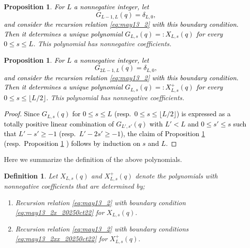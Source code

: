 \documentclass[sn-mathphys-num]{sn-jnl}%
\newcommand{\red}[1]{\textcolor{black}{#1}}
\theoremstyle{thmstyleone}%
\newtheorem{proposition}[theorem]{Proposition}%
\theoremstyle{thmstyletwo}%
\theoremstyle{thmstylethree}%
\newtheorem{definition}{Definition}%
\begin{document}
\begin{proposition}\label{prop:2025oct24_1}
\red{For $L$ a nonnegative integer, let 
\begin{equation} \label{eq:may13_2x_20250ct22}
G_{L-1,L}(q) = \delta_{L,0}, 
\end{equation}
and consider the recursion relation \eqref{eq:may13_2} with this boundary condition.
Then it determines a unique polynomial $G_{L,s}(q) =: X_{L,s}(q)$ for every $0 \leq s \leq L$.}
This polynomial has nonnegative coefficients.
\end{proposition}

\begin{proposition}\label{prop:2025oct24_2}
\red{For $L$ a nonnegative integer, let 
\begin{equation} \label{eq:may13_2xx_20250ct22}
G_{2L-1,L}(q) = \delta_{L,0}, 
\end{equation}
and consider the recursion relation \eqref{eq:may13_2} with this boundary condition.
Then it determines a unique polynomial $G_{L,s}(q) =: X^+_{L,s}(q)$ for every
$0 \leq s \leq \lfloor L/2 \rfloor$.}
This polynomial has nonnegative coefficients.
\end{proposition}
\red{
\begin{proof}
Since $G_{L,s}(q)$ for $0 \leq s \leq L$ (resp.~$0 \leq s \leq \lfloor L/2 \rfloor$)
is expressed as a totally positive linear combination of 
$G_{L',s'}(q)$ with $L'<L$ and $0\leq s'\leq s$ such that $L'-s'\geq -1$
(resp.~$L'-2s'\geq -1$), the claim of Proposition \ref{prop:2025oct24_1} 
(resp.~Proposition \ref{prop:2025oct24_2} ) follows
by induction on $s$ and $L$.
\end{proof}
}



Here we summarize the definition of the above polynomials.
\begin{definition}\label{def:2}
Let $X_{L,s}(q)$ and $X^+_{L,s}(q)$ denote the polynomials with
nonnegative coefficients that are determined by;
\begin{enumerate}
\item Recursion relation \eqref{eq:may13_2} with boundary condition \eqref{eq:may13_2x_20250ct22} for $X_{L,s}(q)$.
\item Recursion relation \eqref{eq:may13_2} with boundary conditions \eqref{eq:may13_2xx_20250ct22} for $X^+_{L,s}(q)$.
\end{enumerate}
\end{definition}
\end{document}
